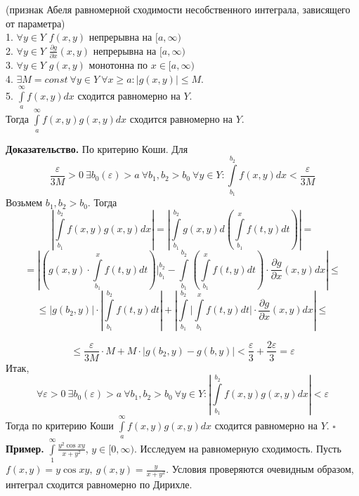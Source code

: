 \begin{theor}
    (признак Абеля равномерной сходимости несобственного интеграла, 
    зависящего от параметра)\\
    1. $\forall y\in Y$ $f(x,y)$ непрерывна на  $[a,\infty)$\\
    2. $\forall y\in Y$ $\frac{\partial g}{\partial x}(x,y)$ 
    непрерывна на  $[a,\infty)$\\
    3. $\forall y\in Y$ $g(x,y)$ монотонна по $x\in [a,\infty)$\\
    4. $\exists M=const~\forall y\in Y~\forall x\geqslant a:
    \left| g(x,y)\right|\leqslant M$.\\
    5. $\int\limits_{a}^{\infty}f(x,y)dx$ сходится равномерно на $Y$.\\
    Тогда $\int\limits_{a}^{\infty}f(x,y)g(x,y)dx$ сходится равномерно на
    $Y$.
\end{theor}
\textbf{Доказательство.}  По критерию Коши. 
Для
$$\frac{\varepsilon}{3M}>0~\exists b_0(\varepsilon)>a~\forall b_1,b_2>b_0~
\forall y\in Y: \int\limits_{b_1}^{b_2}f(x,y)dx<\frac{\varepsilon}{3M}$$ 
Возьмем $b_1,b_2>b_0$. Тогда
\begin{equation*}
\left| \int\limits_{b_1}^{b_2}f(x,y)g(x,y)dx \right| = 
\left| \int\limits_{b_1}^{b_2}g(x,y)d\left( \int\limits_{b_1}^{x}f(t,y)dt
\right)   \right| = 
\end{equation*}
$$=\left|\left( g(x,y)\cdot\int\limits_{b_1}^{x}f(t,y)dt\right)
\bigg|^{b_2}_{b_1}
- \int\limits_{b_1}^{b_2} \left( \int\limits_{b_1}^{x} f(t,y)dt \right) \cdot 
\frac{\partial g}{\partial x} (x,y)dx \right|\leqslant$$
$$\leqslant 
\left| g(b_2,y) \right|\cdot \left| \int\limits_{b_1}^{b_2}f(t,y)dt \right| +
\left| \int\limits_{b_1}^{b_2} \bigg| \int\limits_{b_1}^{x}f(t,y)dt\bigg|\cdot 
\frac{\partial g}{\partial x} (x,y)dx \right| \leqslant $$ 

$$\leqslant \frac{\varepsilon}{3M}\cdot M+
M\cdot |g(b_2,y)-g(b,y)|<\frac{\varepsilon}{3}+\frac{2\varepsilon}{3}=
\varepsilon$$ 
Итак, 
$$\forall \varepsilon>0~\exists b_0(\varepsilon)>a~\forall b_1,b_2>b_0~
\forall y\in Y:\left| \int\limits_{b_1}^{b_2}f(x,y)g(x,y)dx\right| 
<\varepsilon$$ 
Тогда по 
критерию Коши $\int\limits_{a}^{\infty}f(x,y)g(x,y)dx$ сходится равномерно на
$Y$. $\square$ \\

\textbf{Пример.} $\int\limits_{1}^{\infty} \frac{y^2\cos xy}{x+y^2}$,
$y\in [0,\infty)$. Исследуем на равномерную сходимость. Пусть
$f(x,y)=y\cos xy,~g(x,y)=\frac{y}{x+y^2}$. Условия проверяются очевидным
образом, интеграл сходится равномерно по Дирихле. 

